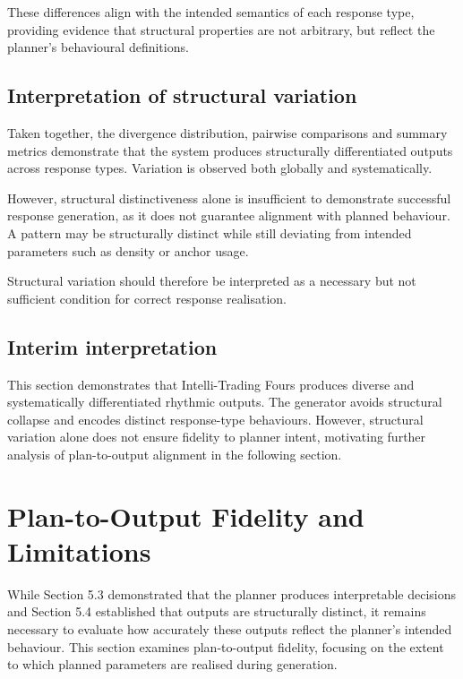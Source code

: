 These differences align with the intended semantics of each response
type, providing evidence that structural properties are not arbitrary,
but reflect the planner's behavioural definitions.

\subsection{Interpretation of structural variation}\label{interpretation-of-structural-variation}

Taken together, the divergence distribution, pairwise comparisons and
summary metrics demonstrate that the system produces structurally
differentiated outputs across response types. Variation is observed both
globally and systematically.

However, structural distinctiveness alone is insufficient to demonstrate
successful response generation, as it does not guarantee alignment with
planned behaviour. A pattern may be structurally distinct while still
deviating from intended parameters such as density or anchor usage.

Structural variation should therefore be interpreted as a necessary but
not sufficient condition for correct response realisation.

\subsection{Interim interpretation}\label{interim-interpretation-1}

This section demonstrates that Intelli-Trading Fours produces diverse
and systematically differentiated rhythmic outputs. The generator avoids
structural collapse and encodes distinct response-type behaviours.
However, structural variation alone does not ensure fidelity to planner
intent, motivating further analysis of plan-to-output alignment in the
following section.

\section{Plan-to-Output Fidelity and Limitations}\label{plan-to-output-fidelity-and-limitations}

While Section 5.3 demonstrated that the planner produces interpretable
decisions and Section 5.4 established that outputs are structurally
distinct, it remains necessary to evaluate how accurately these outputs
reflect the planner's intended behaviour. This section examines
plan-to-output fidelity, focusing on the extent to which planned
parameters are realised during generation.


